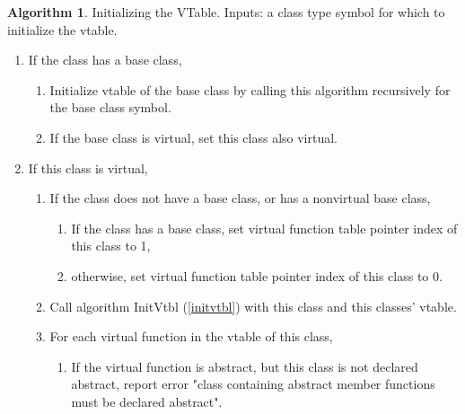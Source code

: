 \documentclass[a4paper,oneside,11pt]{book}
\theoremstyle{definition}
\newtheorem{algo}{Algorithm}[section]
\begin{document}
\begin{algo}\label{initvtable} Initializing the VTable. Inputs: a class type symbol for which to initialize the vtable.
\begin{enumerate}
\item
If the class has a base class,
\begin{enumerate}
\item
Initialize vtable of the base class by calling this algorithm recursively for the base class symbol.
\item
If the base class is virtual, set this class also virtual.
\end{enumerate}
\item
If this class is virtual,
\begin{enumerate}
\item
If the class does not have a base class, or has a nonvirtual base class,
\begin{enumerate}
\item
If the class has a base class, set virtual function table pointer index of this class to 1,
\item
otherwise, set virtual function table pointer index of this class to 0.
\end{enumerate}
\item
Call algorithm InitVtbl (\ref{initvtbl}) with this class and this classes' vtable.
\item
For each virtual function in the vtable of this class,
\begin{enumerate}
\item
If the virtual function is abstract, but this class is not declared abstract, report error "class containing abstract member functions must be declared abstract".
\end{enumerate}
\end{enumerate}
\end{enumerate}
\end{algo}
\end{document}
